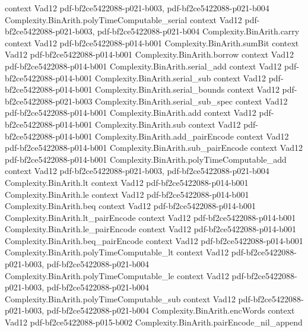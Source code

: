 \begin{theorem}
  {context}
  {Vad12}
  {pdf-bf2ce5422088-p021-b003,
    pdf-bf2ce5422088-p021-b004}
\proofstep
  {Complexity.BinArith.polyTimeComputable_serial}
  {context}
  {Vad12}
  {pdf-bf2ce5422088-p021-b003,
    pdf-bf2ce5422088-p021-b004}
\proofstep
  {Complexity.BinArith.carry}
  {context}
  {Vad12}
  {pdf-bf2ce5422088-p014-b001}
\proofstep
  {Complexity.BinArith.sumBit}
  {context}
  {Vad12}
  {pdf-bf2ce5422088-p014-b001}
\proofstep
  {Complexity.BinArith.borrow}
  {context}
  {Vad12}
  {pdf-bf2ce5422088-p014-b001}
\proofstep
  {Complexity.BinArith.serial_add}
  {context}
  {Vad12}
  {pdf-bf2ce5422088-p014-b001}
\proofstep
  {Complexity.BinArith.serial_sub}
  {context}
  {Vad12}
  {pdf-bf2ce5422088-p014-b001}
\proofstep
  {Complexity.BinArith.serial_bounds}
  {context}
  {Vad12}
  {pdf-bf2ce5422088-p021-b003}
\proofstep
  {Complexity.BinArith.serial_sub_spec}
  {context}
  {Vad12}
  {pdf-bf2ce5422088-p014-b001}
\proofstep
  {Complexity.BinArith.add}
  {context}
  {Vad12}
  {pdf-bf2ce5422088-p014-b001}
\proofstep
  {Complexity.BinArith.sub}
  {context}
  {Vad12}
  {pdf-bf2ce5422088-p014-b001}
\proofstep
  {Complexity.BinArith.add_pairEncode}
  {context}
  {Vad12}
  {pdf-bf2ce5422088-p014-b001}
\proofstep
  {Complexity.BinArith.sub_pairEncode}
  {context}
  {Vad12}
  {pdf-bf2ce5422088-p014-b001}
\proofstep
  {Complexity.BinArith.polyTimeComputable_add}
  {context}
  {Vad12}
  {pdf-bf2ce5422088-p021-b003,
    pdf-bf2ce5422088-p021-b004}
\proofstep
  {Complexity.BinArith.lt}
  {context}
  {Vad12}
  {pdf-bf2ce5422088-p014-b001}
\proofstep
  {Complexity.BinArith.le}
  {context}
  {Vad12}
  {pdf-bf2ce5422088-p014-b001}
\proofstep
  {Complexity.BinArith.beq}
  {context}
  {Vad12}
  {pdf-bf2ce5422088-p014-b001}
\proofstep
  {Complexity.BinArith.lt_pairEncode}
  {context}
  {Vad12}
  {pdf-bf2ce5422088-p014-b001}
\proofstep
  {Complexity.BinArith.le_pairEncode}
  {context}
  {Vad12}
  {pdf-bf2ce5422088-p014-b001}
\proofstep
  {Complexity.BinArith.beq_pairEncode}
  {context}
  {Vad12}
  {pdf-bf2ce5422088-p014-b001}
\proofstep
  {Complexity.BinArith.polyTimeComputable_lt}
  {context}
  {Vad12}
  {pdf-bf2ce5422088-p021-b003,
    pdf-bf2ce5422088-p021-b004}
\proofstep
  {Complexity.BinArith.polyTimeComputable_le}
  {context}
  {Vad12}
  {pdf-bf2ce5422088-p021-b003,
    pdf-bf2ce5422088-p021-b004}
\proofstep
  {Complexity.BinArith.polyTimeComputable_sub}
  {context}
  {Vad12}
  {pdf-bf2ce5422088-p021-b003,
    pdf-bf2ce5422088-p021-b004}
\proofstep
  {Complexity.BinArith.encWords}
  {context}
  {Vad12}
  {pdf-bf2ce5422088-p015-b002}
\proofstep
  {Complexity.BinArith.pairEncode_nil_append}

\end{theorem}
